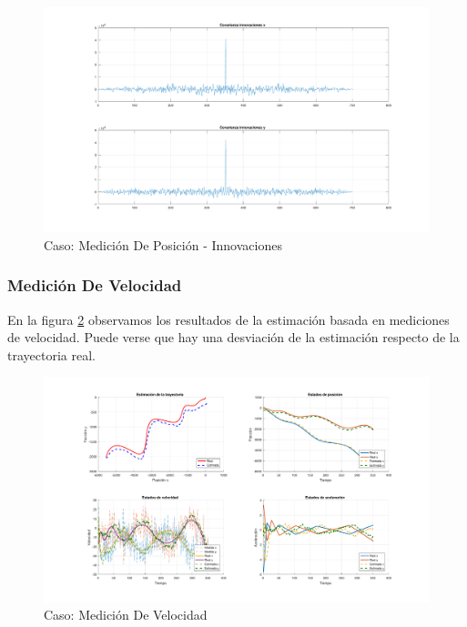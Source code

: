 		\begin{figure}[H]
			\centering
			\includegraphics[width=1.0\textwidth,keepaspectratio]{Figuras/covinn_ej2a.pdf}
			\caption{Caso: Medición De Posición - Innovaciones}
			\label{fig:ej2a_innov}
		\end{figure}
		
		\subsubsection{Medición De Velocidad}
		
		En la figura \ref{fig:ej2b} observamos los resultados de la estimación basada en mediciones de velocidad. Puede verse que hay una desviación de la estimación respecto de la trayectoria real.
		
		\begin{figure}[H]
			\centering
			\includegraphics[width=1.0\textwidth,keepaspectratio]{Figuras/graf_ej2b.pdf}
			\caption{Caso: Medición De Velocidad}
			\label{fig:ej2b}
		\end{figure}
		
